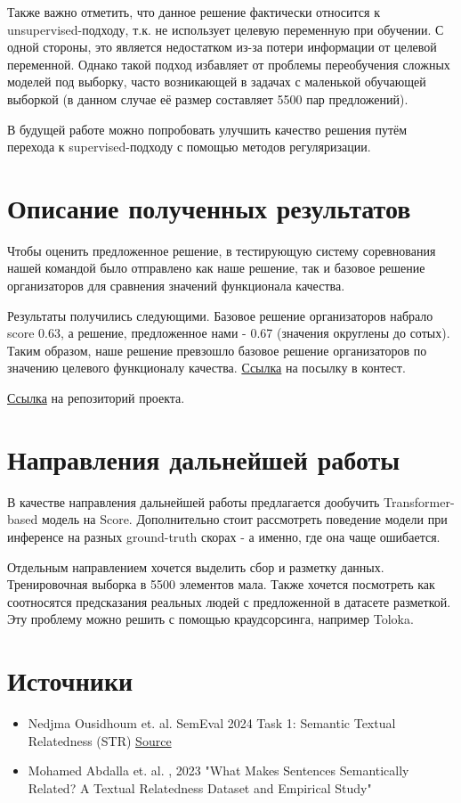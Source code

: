 \documentclass[12pt]{article}
\begin{document}
Также важно отметить, что данное решение фактически относится к unsupervised-подходу, т.к. не использует целевую переменную при обучении. С одной стороны, это является недостатком из-за потери информации от целевой переменной. Однако такой подход избавляет от проблемы переобучения сложных моделей под выборку, часто возникающей в задачах с маленькой обучающей выборкой (в данном случае её размер составляет 5500 пар предложений).

В будущей работе можно попробовать улучшить качество решения путём перехода к supervised-подходу с помощью методов регуляризации.

\newpage


\section{Описание полученных результатов}
Чтобы оценить предложенное решение, в тестирующую систему соревнования нашей командой было отправлено как наше решение, так и базовое решение организаторов для сравнения значений функционала качества.

Результаты получились следующими. Базовое решение организаторов набрало score 0.63, а решение, предложенное нами - 0.67 (значения округлены до сотых). Таким образом, наше решение превзошло базовое решение организаторов по значению целевого функционалу качества. \href{https://codalab.lisn.upsaclay.fr/my/competition/submission/588203/detailed_results/}{Ссылка} на посылку в контест.

\href{https://github.com/wwwwwert/NLP_project}{Ссылка} на репозиторий проекта.

\section{Направления дальнейшей работы}
В качестве направления дальнейшей работы предлагается дообучить Transformer-based модель на Score. Дополнительно стоит рассмотреть поведение модели при инференсе на разных ground-truth скорах - а именно, где она чаще ошибается.

Отдельным направлением хочется выделить сбор и разметку данных. Тренировочная выборка в 5500 элементов мала. Также хочется посмотреть как соотносятся предсказания реальных людей с предложенной в датасете разметкой. Эту проблему можно решить с помощью краудсорсинга, например Toloka.
\newpage


\section{Источники}
\begin{itemize}
    \item Nedjma Ousidhoum et. al. SemEval 2024 Task 1: Semantic Textual Relatedness (STR)
   \href{https://semantic-textual-relatedness.github.io/}{Source}

   \item Mohamed Abdalla et. al. , 2023 "What Makes Sentences Semantically Related?
   A Textual Relatedness Dataset and Empirical Study"
\end{itemize}
\end{document}
